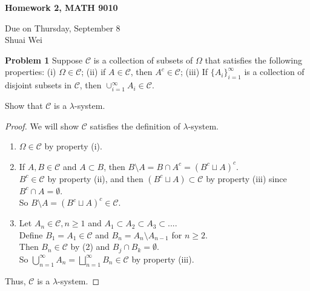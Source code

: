 \documentclass{article}
\newcommand{\llc}{\mathcal{C}}
\begin{document}
\begin{center}

\textbf{Homework 2, MATH 9010}

Due on Thursday, September 8\\

Shuai Wei

\end{center}

\vspace{3 mm}

\noindent \textbf{Problem 1} Suppose $\mathcal{C}$ is a collection of subsets of $\Omega$ that satisfies the following properties:  (i) $\Omega \in \mathcal{C}$; (ii) if $A \in \mathcal{C}$, then $A^{c} \in \mathcal{C}$; (iii) If $\{A_{i}\}_{i = 1}^{\infty}$ is a collection of disjoint subsets in $\mathcal{C}$, then $\cup_{i=1}^{\infty}A_{i} \in \mathcal{C}$.

\vspace{2 mm}

Show that $\mathcal{C}$ is a $\lambda$-system.


\begin{proof}
	We will show $\llc$ satisfies the definition of $\lambda$-system.
	\begin{enumerate}[(1)]
		\item $\Omega \in \llc$ by property (i).
		\item If $A, B \in \llc$ and $A \subset B$, then $B\setminus A = B \cap A^c = (B^c \sqcup A)^c$. \\
			$B^c \in \llc$ by property (ii), and then $(B^c \sqcup A) \subset \llc$ by property (iii) since $B^c \cap A = \emptyset$. \\
		So $B\setminus A = (B^c \sqcup A)^c \in \llc$. 
		\item 
		Let $A_n \in \llc, n\geq 1$ and $A_1 \subset A_2 \subset A_3 \subset ...$.\\
		Define $B_1 = A_1 \in \llc$ and $B_n = A_n \setminus A_{n-1} $ for $n \geq 2$.\\
		Then $B_n \in \llc$ by (2) and $B_j \cap B_k = \emptyset$.\\
		So $\bigcup_{n=1}^{\infty}A_n = \bigsqcup_{n=1}^{\infty}B_n \in \llc$ by property (iii).
	\end{enumerate}
	Thus, $\llc$ is a $\lambda$-system.
\end{proof}
\end{document}

